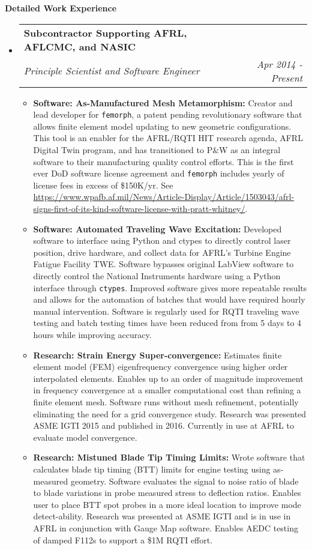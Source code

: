 \documentclass[letterpaper,11pt]{article}
\makeatletter
\newcommand{\resitem}[1]{\item #1 \vspace{-2pt}}
\newcommand{\resheading}[1]{{\large \colorbox{mygrey}{\begin{minipage}{\textwidth}{\textbf{#1 \vphantom{p\^{E}}}}\end{minipage}}}}
\newcommand{\ressubheading}[4]{
\begin{tabular*}{7.0in}{l@{\extracolsep{\fill}}r}
		\textbf{#1} & #2 \\
		\textit{#3} & \textit{#4} \\
\end{tabular*}\vspace{-6pt}}
\makeatother
\begin{document}
\newpage

\resheading{Detailed Work Experience}
\begin{itemize}

\item
  \ressubheading{Subcontractor Supporting AFRL, AFLCMC, and NASIC}{}{Principle Scientist and Software Engineer}{Apr 2014 - Present}
  \begin{itemize}
    \resitem{\textbf{Software: As-Manufactured Mesh Metamorphism:} Creator and lead developer for \texttt{femorph}, a patent pending revolutionary software that allows finite element model updating to new geometric configurations. This tool is an enabler for the AFRL/RQTI HIT research agenda, AFRL Digital Twin program, and has transitioned to P\&W as an integral software to their manufacturing quality control efforts. This is the first ever DoD software license agreement and \texttt{femorph} includes yearly of license fees in excess of \$150K/yr. See \url{https://www.wpafb.af.mil/News/Article-Display/Article/1503043/afrl-signs-first-of-its-kind-software-license-with-pratt-whitney/}.}
    \resitem{\textbf{Software: Automated Traveling Wave Excitation:} Developed software to interface using Python and ctypes to directly control laser position, drive hardware, and collect data for AFRL's Turbine Engine Fatigue Facility TWE. Software bypasses original LabView software to directly control the National Instruments hardware using a Python interface through \texttt{ctypes}. Improved software gives more repeatable results and allows for the automation of batches that would have required hourly manual intervention. Software is regularly used for RQTI traveling wave testing and batch testing times have been reduced from from 5 days to 4 hours while improving accuracy.}
    \resitem{\textbf{Research: Strain Energy Super-convergence:}  Estimates finite element model (FEM) eigenfrequency convergence using higher order interpolated elements. Enables up to an order of magnitude improvement in frequency convergence at a smaller computational cost than refining a finite element mesh. Software runs without mesh refinement, potentially eliminating the need for a grid convergence study. Research was presented ASME IGTI 2015 and published in 2016. Currently in use at AFRL to evaluate model convergence.}
    \resitem{\textbf{Research: Mistuned Blade Tip Timing Limits:}  Wrote software that calculates blade tip timing (BTT) limits for engine testing using as-measured geometry. Software evaluates the signal to noise ratio of blade to blade variations in probe measured stress to deflection ratios. Enables user to place BTT spot probes in a more ideal location to improve mode detect-ability. Research was presented at ASME IGTI and is in use in AFRL in conjunction with Gauge Map software. Enables AEDC testing of damped F112s to support a \$1M RQTI effort.}

\end{itemize}
\end{itemize}
\end{document}
